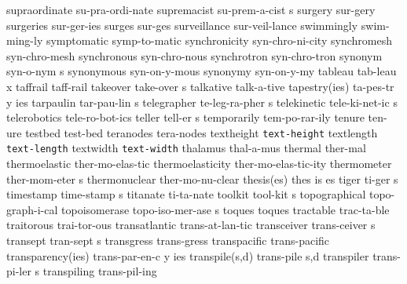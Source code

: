 \NewWordtrue
\1 supraordinate	su-pra-ordi-nate	%
\5 supremacist		su-prem-a-cist s
\1 surgery		sur-gery		%
\1 surgeries		sur-ger-ies		%
\1 surges		sur-ges 		%
\1 surveillance		sur-veil-lance
\1 swimmingly		swim-ming-ly
\1 symptomatic		symp-to-matic
\NewWordtrue
\1 synchronicity	syn-chro-ni-city
\1 synchromesh		syn-chro-mesh
\1 synchronous		syn-chro-nous
\1 synchrotron		syn-chro-tron
\NewWordtrue
\5 synonym		syn-o-nym s		%
\NewWordtrue
\1 synonymous		syn-on-y-mous		%
\NewWordtrue
\1 synonymy		syn-on-y-my		%
\NewWordtrue
\5 tableau		tab-leau x		%
\1 taffrail		taff-rail		%
\5 takeover		take-over s		%
\1 talkative		talk-a-tive
\3 tapestry(ies)	ta-pes-tr y ies
\5 tarpaulin		tar-pau-lin s
\5 telegrapher		te-leg-ra-pher s
\5 telekinetic		tele-ki-net-ic s
\1 telerobotics		tele-ro-bot-ics
\5 teller		tell-er s		%
\1 temporarily		tem-po-rar-ily		%
\1 tenure		ten-ure
\1 testbed		test-bed
\1 teranodes		tera-nodes		%
\1 textheight		{\tt\bs text-height}	%
\1 textlength		{\tt\bs text-length}	%
\1 textwidth		{\tt\bs text-width}
\1 thalamus		thal-a-mus
\NewWordtrue
\1 thermal		ther-mal		%
\1 thermoelastic	ther-mo-elas-tic
\NewWordtrue
\1 thermoelasticity	ther-mo-elas-tic-ity	%
\NewWordtrue
\5 thermometer		ther-mom-eter s 	%
\NewWordtrue
\1 thermonuclear	ther-mo-nu-clear	%
\NewWordtrue
\3 thesis(es)		thes is es \thinspace*	%
\NewWordtrue
\5 tiger		ti-ger s		%
\5 timestamp		time-stamp s
\NewWordtrue
\1 titanate		ti-ta-nate		%
\5 toolkit		tool-kit s
\1 topographical	topo-graph-i-cal
\5 topoisomerase	topo-iso-mer-ase s	%
\1 toques		toques
\NewWordtrue
\1 tractable	 	trac-ta-ble		%
\1 traitorous		trai-tor-ous
\NewWordtrue
\1 transatlantic	trans-at-lan-tic	%
\5 transceiver		trans-ceiver s
\NewWordtrue
\5 transept		tran-sept s		%
\1 transgress		trans-gress
\NewWordtrue
\1 transpacific		trans-pacific		%
\3 transparency(ies)	trans-par-en-c y ies	%
\NewWordtrue
\2 transpile(s,d)	trans-pile s,d		%
\NewWordtrue
\5 transpiler		trans-pi-ler s		%
\NewWordtrue
\1 transpiling		trans-pil-ing		%
